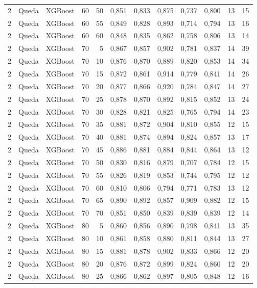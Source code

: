 \begin{longtable}{ccclrrrrrrrr}
2 & Queda & XGBoost & 60 & 50 & 0,851 & 0,833 & 0,875 & 0,737 & 0,800 & 13 & 15 \\
2 & Queda & XGBoost & 60 & 55 & 0,849 & 0,828 & 0,893 & 0,714 & 0,794 & 13 & 16 \\
2 & Queda & XGBoost & 60 & 60 & 0,848 & 0,835 & 0,862 & 0,758 & 0,806 & 13 & 14 \\
2 & Queda & XGBoost & 70 & 5 & 0,867 & 0,857 & 0,902 & 0,781 & 0,837 & 14 & 39 \\
2 & Queda & XGBoost & 70 & 10 & 0,876 & 0,870 & 0,889 & 0,820 & 0,853 & 14 & 34 \\
2 & Queda & XGBoost & 70 & 15 & 0,872 & 0,861 & 0,914 & 0,779 & 0,841 & 14 & 26 \\
2 & Queda & XGBoost & 70 & 20 & 0,877 & 0,866 & 0,920 & 0,784 & 0,847 & 14 & 27 \\
2 & Queda & XGBoost & 70 & 25 & 0,878 & 0,870 & 0,892 & 0,815 & 0,852 & 13 & 24 \\
2 & Queda & XGBoost & 70 & 30 & 0,828 & 0,821 & 0,825 & 0,765 & 0,794 & 14 & 23 \\
2 & Queda & XGBoost & 70 & 35 & 0,881 & 0,872 & 0,904 & 0,810 & 0,855 & 12 & 15 \\
2 & Queda & XGBoost & 70 & 40 & 0,881 & 0,874 & 0,894 & 0,824 & 0,857 & 13 & 17 \\
2 & Queda & XGBoost & 70 & 45 & 0,886 & 0,881 & 0,884 & 0,844 & 0,864 & 13 & 12 \\
2 & Queda & XGBoost & 70 & 50 & 0,830 & 0,816 & 0,879 & 0,707 & 0,784 & 12 & 15 \\
2 & Queda & XGBoost & 70 & 55 & 0,826 & 0,819 & 0,853 & 0,744 & 0,795 & 12 & 12 \\
2 & Queda & XGBoost & 70 & 60 & 0,810 & 0,806 & 0,794 & 0,771 & 0,783 & 13 & 12 \\
2 & Queda & XGBoost & 70 & 65 & 0,890 & 0,892 & 0,857 & 0,909 & 0,882 & 12 & 15 \\
2 & Queda & XGBoost & 70 & 70 & 0,851 & 0,850 & 0,839 & 0,839 & 0,839 & 12 & 14 \\
2 & Queda & XGBoost & 80 & 5 & 0,860 & 0,856 & 0,890 & 0,798 & 0,841 & 13 & 35 \\
2 & Queda & XGBoost & 80 & 10 & 0,861 & 0,858 & 0,880 & 0,811 & 0,844 & 13 & 27 \\
2 & Queda & XGBoost & 80 & 15 & 0,881 & 0,878 & 0,902 & 0,833 & 0,866 & 12 & 20 \\
2 & Queda & XGBoost & 80 & 20 & 0,876 & 0,872 & 0,899 & 0,824 & 0,860 & 12 & 20 \\
2 & Queda & XGBoost & 80 & 25 & 0,866 & 0,862 & 0,897 & 0,805 & 0,848 & 12 & 16 \\

\end{longtable}
